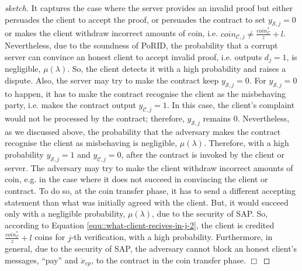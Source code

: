 \begin{proof}[sketch]
     
     It captures the case where the server provides an invalid  proof but either persuades the client to accept the proof, or  persuades the contract to set $y_{\scriptscriptstyle \mathcal{S},j}=0$  or makes the client  withdraw incorrect amounts of coin, i.e.    $coin_{\scriptscriptstyle\mathcal{C},j}\neq \frac{coin_{\scriptscriptstyle\mathcal C}^{\scriptscriptstyle*}}{z}+l$.   Nevertheless, due to the soundness of PoRID, the probability that a corrupt server can convince an honest client to accept invalid proof, i.e. outputs $d_{\scriptscriptstyle j}=1$, is negligible, $\mu(\lambda)$. So, the client detects it with a high probability and raises a dispute.  Also, the server may try to make the contract keep $y_{\scriptscriptstyle \mathcal {S},j}=0$. For $y_{\scriptscriptstyle \mathcal {S},j}=0$ to happen, it has to make the contract  recognise the client as the misbehaving party, i.e. makes the contract output $y_{\scriptscriptstyle \mathcal {C},j}=1$. In this case, the client's complaint would not be processed by the contract; therefore,  $y_{\scriptscriptstyle \mathcal {S},j}$ remains $0$.   Nevertheless, as we discussed above, the probability that the adversary makes the contract  recognise the client as misbehaving is negligible, $\mu(\lambda)$. Therefore, with a high probability  $y_{\scriptscriptstyle \mathcal {S},j}=1$ and $y_{\scriptscriptstyle \mathcal {C},j}=0$, after the contract  is invoked by the client or  server. The adversary may  try to  make the client withdraw  incorrect amounts of coin, e.g. in the case where it does not succeed in convincing the client or contract. To do so,  at the coin transfer phase, it has to send a  different accepting statement  than what was initially agreed with the client. But, it would succeed only with a negligible   probability, $\mu(\lambda)$, due to the security of SAP.   So, according to Equation \ref{equ::what-client-recives-in-j-2}, the client is credited $\frac{coin_{\scriptscriptstyle\mathcal C}^{\scriptscriptstyle*}}{z}+l$ coins for $j$-th verification, with a high probability. Furthermore, in   general, due to the security of SAP, the adversary cannot block an honest client's  messages, ``pay'' and $\ddot{x}_{\scriptscriptstyle cp}$, to the contract in the coin transfer phase.
  \hfill\(\Box\)\end{proof}

